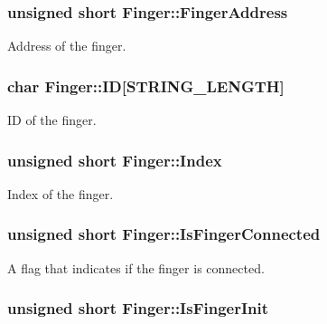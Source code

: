 \subsubsection[{\texorpdfstring{Finger\+Address}{FingerAddress}}]{\setlength{\rightskip}{0pt plus 5cm}unsigned short Finger\+::\+Finger\+Address}\hypertarget{struct_finger_aba71b81dc24eb8f34254954707789cd4}{}\label{struct_finger_aba71b81dc24eb8f34254954707789cd4}


Address of the finger. 

\subsubsection[{\texorpdfstring{ID}{ID}}]{\setlength{\rightskip}{0pt plus 5cm}char Finger\+::\+ID\mbox{[}{\bf S\+T\+R\+I\+N\+G\+\_\+\+L\+E\+N\+G\+TH}\mbox{]}}\hypertarget{struct_finger_a1e81ad463f71627970a8e6820f789fab}{}\label{struct_finger_a1e81ad463f71627970a8e6820f789fab}


ID of the finger. 

\subsubsection[{\texorpdfstring{Index}{Index}}]{\setlength{\rightskip}{0pt plus 5cm}unsigned short Finger\+::\+Index}\hypertarget{struct_finger_ab64ec8787b32917531d6ac4e0c8c3342}{}\label{struct_finger_ab64ec8787b32917531d6ac4e0c8c3342}


Index of the finger. 

\subsubsection[{\texorpdfstring{Is\+Finger\+Connected}{IsFingerConnected}}]{\setlength{\rightskip}{0pt plus 5cm}unsigned short Finger\+::\+Is\+Finger\+Connected}\hypertarget{struct_finger_ae5f0d71293de64ba7d7dd43b4275b439}{}\label{struct_finger_ae5f0d71293de64ba7d7dd43b4275b439}


A flag that indicates if the finger is connected. 

\subsubsection[{\texorpdfstring{Is\+Finger\+Init}{IsFingerInit}}]{\setlength{\rightskip}{0pt plus 5cm}unsigned short Finger\+::\+Is\+Finger\+Init}\hypertarget{struct_finger_a234ae5da6a6f0fd24538c80b8b339c18}{}\label{struct_finger_a234ae5da6a6f0fd24538c80b8b339c18}


